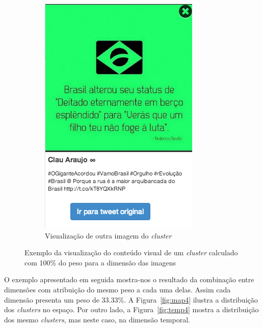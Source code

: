 \begin{figure}[h]
\begin{subfigure}[b]{0.32\textwidth}
	\includegraphics[width=0.85\linewidth]{./figures/olhopassarinho/c2_ex3_im100_1718}
	\caption{ Visualização de outra imagem do \textit{cluster} }
	\label{subfig:im03}
	\end{subfigure}
\caption{Exemplo da visualização do conteúdo visual de um \textit{cluster} calculado com 100\% do peso para a dimensão das imagens}
\label{fig:im00}
\end{figure}


O exemplo apresentado em seguida mostra-nos o resultado da combinação entre dimensões com atribuição do mesmo peso a cada uma delas. Assim cada dimensão presenta um peso de 33.33\%. A Figura~\ref{fig:map4} ilustra a distribuição dos \textit{clusters} no espaço. Por outro lado, a Figura~\ref{fig:temp4} mostra a distribuição dos mesmo \textit{clusters}, mas neste caso, na dimensão temporal.
\vspace{2mm}

